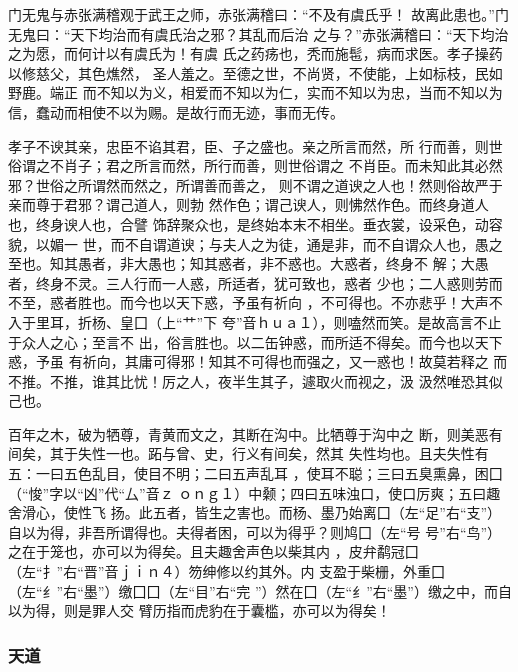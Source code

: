 \documentclass[]{article}
\begin{document}
门无鬼与赤张满稽观于武王之师，赤张满稽曰：``不及有虞氏乎！
故离此患也。''门无鬼曰：``天下均治而有虞氏治之邪？其乱而后治
之与？''赤张满稽曰：``天下均治之为愿，而何计以有虞氏为！有虞
氏之药疡也，秃而施髢，病而求医。孝子操药以修慈父，其色燋然，
圣人羞之。至德之世，不尚贤，不使能，上如标枝，民如野鹿。端正
而不知以为义，相爱而不知以为仁，实而不知以为忠，当而不知以为
信，蠢动而相使不以为赐。是故行而无迹，事而无传。

孝子不谀其亲，忠臣不谄其君，臣、子之盛也。亲之所言而然，所
行而善，则世俗谓之不肖子；君之所言而然，所行而善，则世俗谓之
不肖臣。而未知此其必然邪？世俗之所谓然而然之，所谓善而善之，
则不谓之道谀之人也！然则俗故严于亲而尊于君邪？谓己道人，则勃
然作色；谓己谀人，则怫然作色。而终身道人也，终身谀人也，合譬
饰辞聚众也，是终始本末不相坐。垂衣裳，设采色，动容貌，以媚一
世，而不自谓道谀；与夫人之为徒，通是非，而不自谓众人也，愚之
至也。知其愚者，非大愚也；知其惑者，非不惑也。大惑者，终身不
解；大愚者，终身不灵。三人行而一人惑，所适者，犹可致也，惑者
少也；二人惑则劳而不至，惑者胜也。而今也以天下惑，予虽有祈向
，不可得也。不亦悲乎！大声不入于里耳，折杨、皇囗（上``艹''下
夸''音ｈｕａ１），则嗑然而笑。是故高言不止于众人之心；至言不
出，俗言胜也。以二缶钟惑，而所适不得矣。而今也以天下惑，予虽
有祈向，其庸可得邪！知其不可得也而强之，又一惑也！故莫若释之
而不推。不推，谁其比忧！厉之人，夜半生其子，遽取火而视之，汲
汲然唯恐其似己也。

百年之木，破为牺尊，青黄而文之，其断在沟中。比牺尊于沟中之
断，则美恶有间矣，其于失性一也。跖与曾、史，行义有间矣，然其
失性均也。且夫失性有五：一曰五色乱目，使目不明；二曰五声乱耳
，使耳不聪；三曰五臭熏鼻，困囗（``悛''字以``凶''代``厶''音ｚ
ｏｎｇ１）中颡；四曰五味浊口，使口厉爽；五曰趣舍滑心，使性飞
扬。此五者，皆生之害也。而杨、墨乃始离囗（左``足''右``支''）
自以为得，非吾所谓得也。夫得者困，可以为得乎？则鸠囗（左``号
号''右``鸟''）之在于笼也，亦可以为得矣。且夫趣舍声色以柴其内
，皮弁鹬冠囗（左``扌''右``晋''音ｊｉｎ４）笏绅修以约其外。内
支盈于柴栅，外重囗（左``纟''右``墨''）缴囗囗（左``目''右``完
''）然在囗（左``纟''右``墨''）缴之中，而自以为得，则是罪人交
臂历指而虎豹在于囊槛，亦可以为得矣！

\hypertarget{header-n2155}{%
\subsubsection{天道}\label{header-n2155}}
\end{document}
